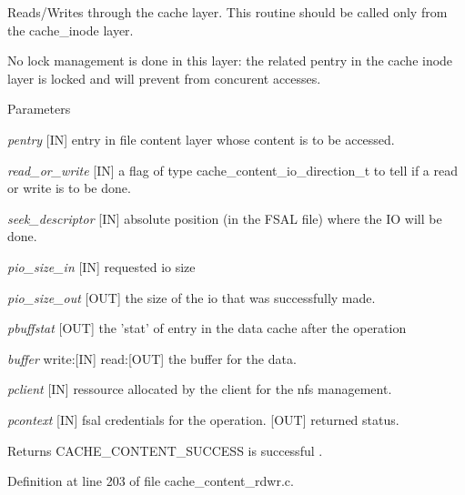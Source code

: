 Reads/Writes through the cache layer. This routine should be called only from the cache\_\-inode layer.

No lock management is done in this layer: the related pentry in the cache inode layer is locked and will prevent from concurent accesses.


\begin{DoxyParams}{Parameters}
\item[{\em pentry}][IN] entry in file content layer whose content is to be accessed. \item[{\em read\_\-or\_\-write}][IN] a flag of type cache\_\-content\_\-io\_\-direction\_\-t to tell if a read or write is to be done. \item[{\em seek\_\-descriptor}][IN] absolute position (in the FSAL file) where the IO will be done. \item[{\em pio\_\-size\_\-in}][IN] requested io size \item[{\em pio\_\-size\_\-out}][OUT] the size of the io that was successfully made. \item[{\em pbuffstat}][OUT] the 'stat' of entry in the data cache after the operation \item[{\em buffer}]write:[IN] read:[OUT] the buffer for the data. \item[{\em pclient}][IN] ressource allocated by the client for the nfs management. \item[{\em pcontext}][IN] fsal credentials for the operation.  [OUT] returned status.\end{DoxyParams}
\begin{DoxyReturn}{Returns}
CACHE\_\-CONTENT\_\-SUCCESS is successful . 
\end{DoxyReturn}


Definition at line 203 of file cache\_\-content\_\-rdwr.c.